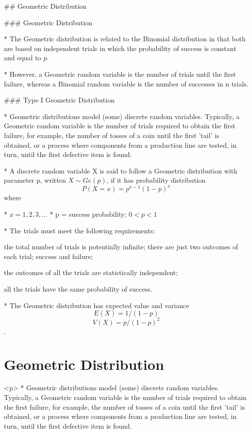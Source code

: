 
  
## Geometric Distribution


### Geometric Distribution


* The Geometric distribution is related to the Binomial distribution in that both are based on independent trials in which the probability of success is constant and equal to $p$. 

* However, a Geometric random variable is the number of trials until the first failure, whereas a Binomial random variable is the number of successes in n trials.

### Type I Geometric Distribution

* Geometric distributions model (some) discrete random variables. Typically, a Geometric random variable is the number of trials required to obtain the first failure, for example, the number of tosses of a coin until the first 'tail' is obtained, or a process where components from a production line are tested, in turn, until the first defective item is found.

* A discrete random variable X is said to follow a Geometric distribution with parameter p, written $X \sim Ge(p)$, if it has probability distribution
\[P(X=x) = p^{x-1}(1-p)^x\]
where

* $x = 1, 2, 3, \ldots$
* p = success probability; $0 < p < 1$

* The trials must meet the following requirements:


\item[(i)] the total number of trials is potentially infinite;
there are just two outcomes of each trial; success and failure;
\item[(ii)] the outcomes of all the trials are statistically independent;
\item[(iii)] all the trials have the same probability of success.

* The Geometric distribution has expected value and variance  \[E(X)= 1/(1-p)\] \[V(X)=p/{(1-p)^2}\].


\section{Geometric Distribution}
<p>
* Geometric distributions model (some) discrete random variables. Typically, a Geometric random variable is the number of trials required to obtain the first failure, for example, the number of tosses of a coin until the first 'tail' is obtained, or a process where components from a production line are tested, in turn, until the first defective item is found.

